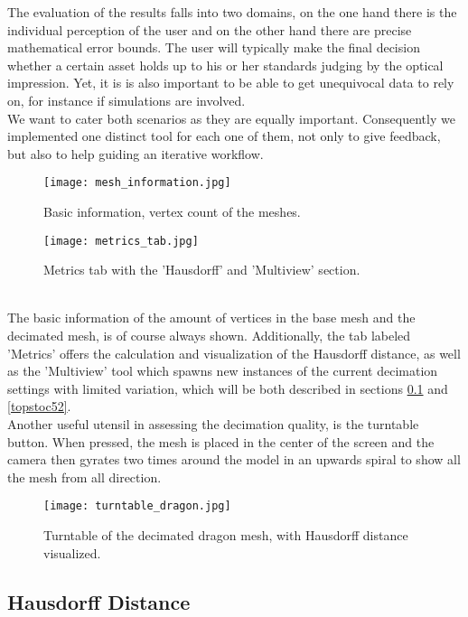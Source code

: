 The evaluation of the results falls into two domains, on the one hand there is the individual perception of the user and on the other hand there are precise mathematical error bounds.
The user will typically make the final decision whether a certain asset holds up to his or her standards judging by the optical impression.
Yet, it is is also important to be able to get unequivocal data to rely on, for instance if simulations are involved.\\
We want to cater both scenarios as they are equally important.
Consequently we implemented one distinct tool for each one of them, not only to give feedback, but also to help guiding an iterative workflow.
\vspace{0.2cm}
\begin{figure}[ht]
\begin{minipage}[b]{0.425\linewidth} \centering
\texttt{[image: mesh\_information.jpg]}
\caption{Basic information, vertex count of the meshes.}
\label{fig:mesh_information}
\end{minipage}
\hspace{1.0cm}
\begin{minipage}[b]{0.5\linewidth}
\centering
\texttt{[image: metrics\_tab.jpg]}
\caption{Metrics tab with the 'Hausdorff' and 'Multiview' section.}
\label{fig:metrics_tab}
\end{minipage}
\end{figure}\\
The basic information of the amount of vertices in the base mesh and the decimated mesh, is of course always shown.
Additionally, the tab labeled 'Metrics' offers the calculation and visualization of the Hausdorff distance, as well as the 'Multiview' tool which spawns new instances of the current decimation settings with limited variation, which will be both described in sections \ref{topstoc51} and \ref{topstoc52}.\\
Another useful utensil in assessing the decimation quality, is the turntable button.
When pressed, the mesh is placed in the center of the screen and the camera then gyrates two times around the model in an upwards spiral to show all the mesh from all direction.
\begin{figure}[ht]
\centering
\texttt{[image: turntable\_dragon.jpg]}
\caption{Turntable of the decimated dragon mesh, with Hausdorff distance visualized.}
\label{fig:turntable_dragon}
\end{figure}

\subsection{Hausdorff Distance}
\label{topstoc51}

